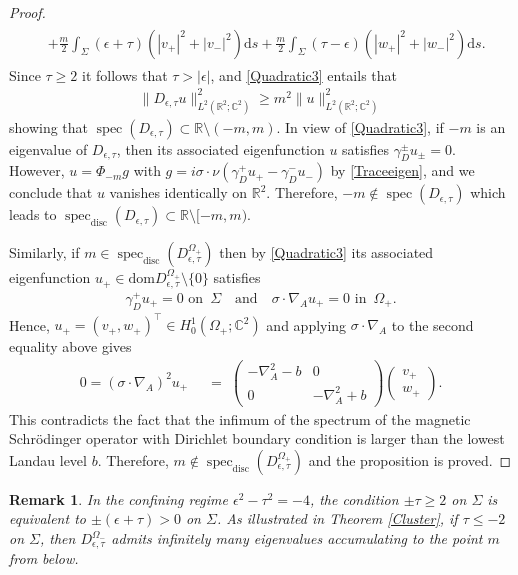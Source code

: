 \documentclass[11pt,a4paper,reqno,oneside]{amsproc}
\DeclareMathOperator{\dom}{dom}
\DeclareMathOperator{\spec}{spec}
\newcommand{\specd}{\spec_\mathrm{disc}}
\def \rr {{\mathbb R}}
\def \cc {{\mathbb C}}
\numberwithin{equation}{section}
\def\dom{\mathrm{dom}}
\def \cc {{\mathbb{C}}}
\newtheorem{remark}[definition]{Remark}
\begin{document}
\begin{proof}
\begin{align}
\begin{split}
 &+ \frac{m}{2} \int_\Sigma (\epsilon+\tau)(|v_+ |^2 + |v_- |^2) \mathrm{d} s   + \frac{m}{2} \int_\Sigma (\tau-\epsilon)( |w_+ |^2 + |w_- |^2)\mathrm{d}s.
 \end{split}
 \end{align}
Since $\tau \geq2$ it follows that $\tau>|\epsilon|$, and  \eqref{Quadratic3} entails that
 \begin{align*}
 \|D_{\epsilon,\tau}u \|^2_{L^2(\rr^2;\cc^2)} \geq m^2 \|u \|^2_{L^2(\rr^2;\cc^2)}
 \end{align*}
 showing that $\spec(D_{\epsilon,\tau})\subset \rr\setminus (-m,m)$. In view of \eqref{Quadratic3}, if $-m$ is an eigenvalue of $D_{\epsilon,\tau}$, then its associated eigenfunction $u$ satisfies $\gamma_D^\pm u_\pm=0$. However, $u=\Phi_{-m} g$ with $g=i\sigma\cdot\nu(\gamma_D^+ u_+-\gamma_D^- u_-)$ by \eqref{Traceeigen}, and we conclude that $u$ vanishes identically on $\rr^2$. Therefore, $-m\notin\spec(D_{\epsilon,\tau})$ which leads to $\specd(D_{\epsilon,\tau})\subset \rr\setminus [-m,m)$.  

Similarly, if  $m\in \specd (D_{\epsilon,\tau}^{\Omega_+})$ then by  \eqref{Quadratic3} its associated eigenfunction $u_+\in \dom D_{\epsilon,\tau}^{\Omega_+}\setminus\{0\}$ satisfies 
\begin{align*}
\gamma_D^+ u_+=0 \,\,\text{on }\,\Sigma \quad\text{and}\quad \sigma\cdot\nabla_A u_+=0 \,\,\text{in }\,\Omega_+.
\end{align*}
Hence, $u_+ =(v_+,w_+)^\top\in H^1_0(\Omega_+;\cc^2)$ and applying $\sigma\cdot\nabla_A$ to the second equality above gives
\begin{align*}
0=(\sigma\cdot\nabla_A)^2 u_+\;\;
&=\; \begin{pmatrix} -\nabla_A^2 - b & 0 \\ 0 & -\nabla_A^2 + b \end{pmatrix}\begin{pmatrix} v_+\\
  w_+
 \end{pmatrix}.
\end{align*}
This contradicts the fact that the infimum of the spectrum of the magnetic Schr\"odinger operator with Dirichlet boundary condition is larger than the lowest Landau level $b$. Therefore,  $m\notin \specd (D_{\epsilon,\tau}^{\Omega_+})$ and the proposition is proved.
\end{proof}
\begin{remark} In the confining regime $\epsilon^2-\tau^2=-4$, the condition  $\pm \tau \geq 2$ on $\Sigma$ is equivalent to $\pm(\epsilon+\tau) >0$ on $\Sigma$. As illustrated in Theorem \ref{Cluster},  if $\tau \leq -2$ on $\Sigma$, then $D^{\Omega_-}_{\epsilon,\tau}$ admits infinitely many eigenvalues accumulating to the point $m$ from below. 
\end{remark}
\end{document}
